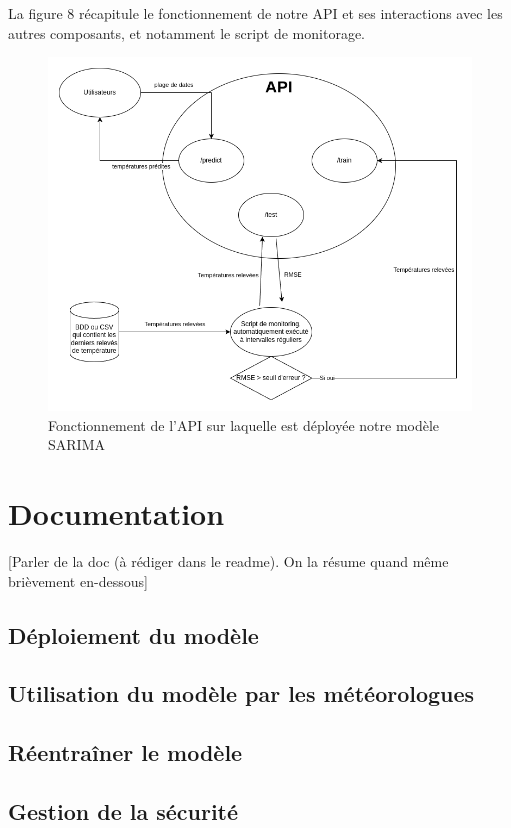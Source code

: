 \documentclass[french]{article}
\begin{document}
    



    La figure 8 récapitule le fonctionnement de notre API et ses interactions avec les autres composants, et notamment le script de monitorage.
    \begin{figure}[h]
        \includegraphics[width=12cm]{schema_API_E2}
        \centering
        \caption{Fonctionnement de l'API sur laquelle est déployée notre modèle SARIMA}
        \centering
    \end{figure}

    \section{Documentation}

    [Parler de la doc (à rédiger dans le readme). On la résume quand même brièvement en-dessous]
    \label{sec:deployment}
    \subsection{Déploiement du modèle}
    \subsection{Utilisation du modèle par les météorologues}
    \subsection{Réentraîner le modèle}
    \subsection{Gestion de la sécurité}
\end{document}
